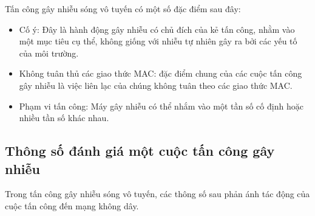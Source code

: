 \documentclass{uetgraduation}
\begin{document}
Tấn công gây nhiễu sóng vô tuyến có một số đặc điểm sau đây:
\begin{itemize}
    \item Cố ý: Đây là hành động gây nhiễu có chủ đích của kẻ tấn công, nhằm vào một mục tiêu cụ thể, không giống với nhiễu tự nhiên gây
    ra bởi các yếu tố của môi trường.
    \item Không tuân thủ các giao thức MAC: đặc điểm chung của các cuộc tấn công gây nhiễu là việc liên lạc của chúng không tuân theo các
    giao thức MAC.
    \item Phạm vi tấn công: Máy gây nhiễu có thể nhắm vào một tần số cố định hoặc nhiều tần số khác nhau.
\end{itemize}

\subsection{Thông số đánh giá một cuộc tấn công gây nhiễu}
Trong tấn công gây nhiễu sóng vô tuyến, các thông số sau phản ánh tác động của cuộc tấn công đến mạng không dây.
\end{document}
